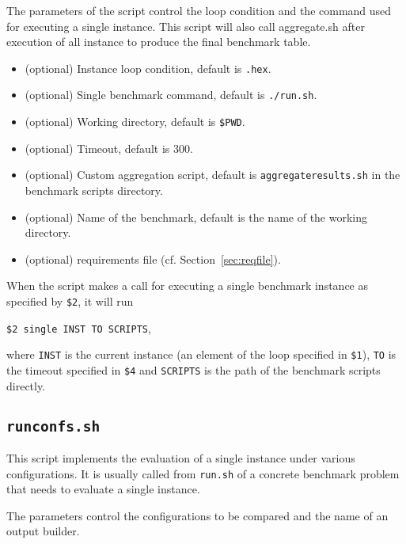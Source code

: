 \documentclass[a4paper]{article}
\begin{document}
		    The parameters of the script control the loop condition
		    and the command used for executing a single instance.
		    This script will also call aggregate.sh after execution of all instance
		    to produce the final benchmark table.
				
		    \medskip{}
		    \begin{itemize}
				\item[{\tt \$1}:] (optional) Instance loop condition, default is {\tt *.hex}.
				\item[{\tt \$2}:] (optional) Single benchmark command, default is {\tt ./run.sh}.
				\item[{\tt \$3}:] (optional) Working directory, default is {\tt \$PWD}.
				\item[{\tt \$4}:] (optional) Timeout, default is {\tt $300$}.
				\item[{\tt \$5}:] (optional) Custom aggregation script, default is {\tt aggregateresults.sh}
					in the benchmark scripts directory.
				\item[{\tt \$6}:] (optional) Name of the benchmark, default is the name of the working directory.
				\item[{\tt \$7}:] (optional) requirements file (cf. Section~\ref{sec:reqfile}).
		    \end{itemize}
		 
		 	When the script makes a call for executing a single benchmark instance
		 	as specified by {\tt \$2}, it will run
		 	\begin{center}
		 		{\tt \$2 single INST TO SCRIPTS},
		 	\end{center}
		 	where {\tt INST} is the current instance (an element of the loop specified in {\tt \$1}),
		 	{\tt TO} is the timeout specified in {\tt \$4}
		 	and {\tt SCRIPTS} is the path of the benchmark scripts directly.
				
		\subsection{\tt runconfs.sh}
		\label{sec:architecture:runconfs}
		
		    This script implements the evaluation of
		    a single instance under various configurations.
		    It is usually called from {\tt run.sh} of a concrete benchmark problem
		    that needs to evaluate a single instance.
		
		    The parameters control the configurations to be compared
		    and the name of an output builder.
		
\end{document}

